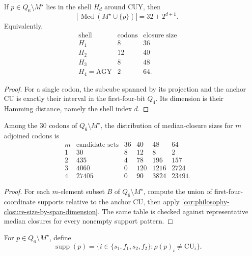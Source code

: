 \begin{theorem}
\label{thm:philosophy-single-codon-span-classification}
If $p\in Q_{6}\setminus M^{\star}$ lies in the shell $H_{d}$ around
$\mathrm{CUY}$, then
$$
  |\operatorname{Med}(M^{\star}\cup\{p\})|
  =
  32+2^{d+1}.
$$
Equivalently,
$$
\begin{array}{c|r|r}
  \text{shell} & \text{codons} & \text{closure size}\\
  \hline
  H_{1} & 8 & 36\\
  H_{2} & 12 & 40\\
  H_{3} & 8 & 48\\
  H_{4}=\mathrm{AGY} & 2 & 64.
\end{array}
$$
\end{theorem}
\begin{proof}
For a single codon, the subcube spanned by its projection and the
anchor $\mathrm{CU}$ is exactly their interval in the first-four-bit
$Q_{4}$. Its dimension is their Hamming distance, namely the shell
index $d$.
\end{proof}

\begin{theorem}
\label{thm:philosophy-external-subset-trigger-counts}
Among the $30$ codons of $Q_{6}\setminus M^{\star}$, the distribution
of median-closure sizes for $m$ adjoined codons is
$$
\begin{array}{r|r|rrrr}
  m & \text{candidate sets} & 36 & 40 & 48 & 64\\
  \hline
  1 & 30 & 8 & 12 & 8 & 2\\
  2 & 435 & 4 & 78 & 196 & 157\\
  3 & 4060 & 0 & 120 & 1216 & 2724\\
  4 & 27405 & 0 & 90 & 3824 & 23491.
\end{array}
$$
\end{theorem}
\begin{proof}
For each $m$-element subset $B$ of $Q_{6}\setminus M^{\star}$, compute
the union of first-four-coordinate supports relative to the anchor
$\mathrm{CU}$, then apply
\autoref{cor:philosophy-closure-size-by-span-dimension}. The same table
is checked against representative median closures for every nonempty
support pattern.
\end{proof}

\begin{definition}
\label{def:philosophy-anchor-relative-support}
For $p\in Q_{6}\setminus M^{\star}$, define
$$
  \operatorname{supp}(p)
  =
  \{i\in\{s_{1},f_{1},s_{2},f_{2}\}:\rho(p)_{i}\neq \mathrm{CU}_{i}\}.
$$
\end{definition}

